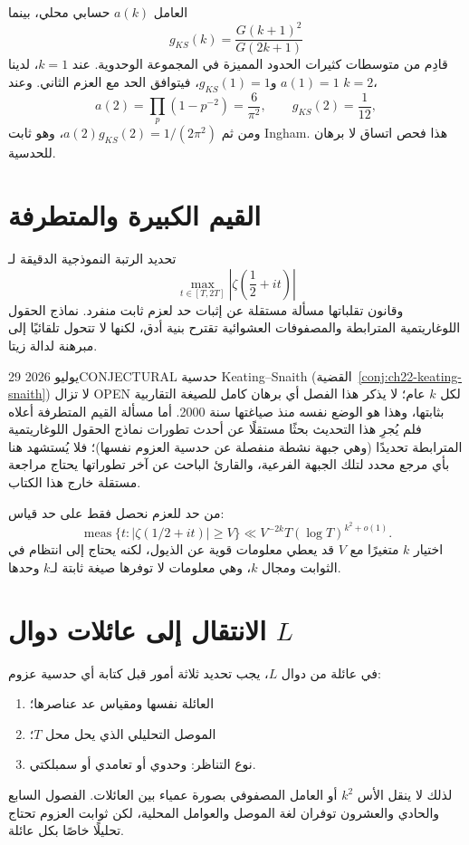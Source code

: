 العامل \(a(k)\) حسابي محلي، بينما
\[
g_{KS}(k)=\frac{G(k+1)^2}{G(2k+1)}
\]
قادِم من متوسطات كثيرات الحدود المميزة في المجموعة الوحدوية. عند \(k=1\)، لدينا \(a(1)=1\) و\(g_{KS}(1)=1\)، فيتوافق الحد مع العزم الثاني. وعند \(k=2\)،
\[
a(2)=\prod_p(1-p^{-2})=\frac6{\pi^2},
\qquad
g_{KS}(2)=\frac1{12},
\]
ومن ثم \(a(2)g_{KS}(2)=1/(2\pi^2)\)، وهو ثابت Ingham. هذا فحص اتساق لا برهان للحدسية.

\section{القيم الكبيرة والمتطرفة}

\begin{openproblem}
\label{open:ch22-extreme-values}
\openresult
تحديد الرتبة النموذجية الدقيقة لـ
\[
\max_{t\in[T,2T]}\left|\zeta\!\left(\frac12+it\right)\right|
\]
وقانون تقلباتها مسألة مستقلة عن إثبات حد لعزم ثابت منفرد. نماذج الحقول اللوغاريتمية المترابطة والمصفوفات العشوائية تقترح بنية أدق، لكنها لا تتحول تلقائيًا إلى مبرهنة لدالة زيتا.
\end{openproblem}

\begin{frontiercard}{29 يوليو 2026}{CONJECTURAL}{\cite{keatingSnaith2000random}}
حدسية Keating--Snaith (القضية~\ref{conj:ch22-keating-snaith}) لا تزال \textenglish{OPEN} لكل \(k\) عام؛ لا يذكر هذا الفصل أي برهان كامل للصيغة التقاربية بثابتها، وهذا هو الوضع نفسه منذ صياغتها سنة 2000. أما مسألة القيم المتطرفة أعلاه فلم يُجرِ هذا التحديث بحثًا مستقلًا عن أحدث تطورات نماذج الحقول اللوغاريتمية المترابطة تحديدًا (وهي جبهة نشطة منفصلة عن حدسية العزوم نفسها)؛ فلا يُستشهد هنا بأي مرجع محدد لتلك الجبهة الفرعية، والقارئ الباحث عن آخر تطوراتها يحتاج مراجعة مستقلة خارج هذا الكتاب.
\end{frontiercard}

من حد للعزم نحصل فقط على حد قياس:
\[
\operatorname{meas}\{t:|\zeta(1/2+it)|\ge V\}
\ll V^{-2k}T(\log T)^{k^2+o(1)}.
\]
اختيار \(k\) متغيرًا مع \(V\) قد يعطي معلومات قوية عن الذيول، لكنه يحتاج إلى انتظام في الثوابت ومجال \(k\)، وهي معلومات لا توفرها صيغة ثابتة لـ\(k\) وحدها.

\section{الانتقال إلى عائلات دوال \(L\)}

في عائلة من دوال \(L\)، يجب تحديد ثلاثة أمور قبل كتابة أي حدسية عزوم:
\begin{enumerate}
  \item العائلة نفسها ومقياس عد عناصرها؛
  \item الموصل التحليلي الذي يحل محل \(T\)؛
  \item نوع التناظر: وحدوي أو تعامدي أو سمبلكتي.
\end{enumerate}
لذلك لا ينقل الأس \(k^2\) أو العامل المصفوفي بصورة عمياء بين العائلات. الفصول السابع والحادي والعشرون توفران لغة الموصل والعوامل المحلية، لكن ثوابت العزوم تحتاج تحليلًا خاصًا بكل عائلة.

